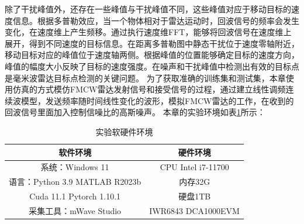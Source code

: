 除了干扰峰值外，还存在一些峰值与干扰峰值不同，这些峰值对应于移动目标的速度信息。根据多普勒效应，当一个物体相对于雷达运动时，回波信号的频率会发生变化，在速度维上产生频移。通过执行速度维FFT，能够将回波信号在速度维上展开，得到不同速度的目标信息。在距离多普勒图中静态干扰位于速度零轴附近，移动目标对应的峰值位于速度轴两侧。根据峰值的位置能够确定目标的速度方向，峰值的幅度大小反映了目标的速度强度。在噪声和干扰峰值中检测出有效的目标点是毫米波雷达目标点检测的关键问题。
为了获取准确的训练集和测试集，本章使用仿真的方式模仿FMCW雷达发射信号和接受信号的过程，通过建立线性调频连续波模型，发送频率随时间线性变化的波形，模拟FMCW雷达的工作，在收到的回波信号里面加入控制信噪比的高斯噪声。
本章的实验环境如表\ref{实验软硬件环境}所示：


\begin{table}[htbp]
	\centering
	\tabcolsep=1cm
	\caption{实验软硬件环境}
	\begin{tabular}{cc}
		\toprule
		软件环境  & 硬件环境 \\
		\midrule
		系统：Windows 11   & CPU Intel i7-11700 \\
		语言：Python 3.9 MATLAB R2023b    & 内存32G \\
		Cuda 11.1 Pytorch 1.10.1   & 硬盘1TB \\
		采集工具：mWave Studio   & IWR6843 DCA1000EVM \\
		\bottomrule
	\end{tabular}
	\label{实验软硬件环境}
\end{table}

